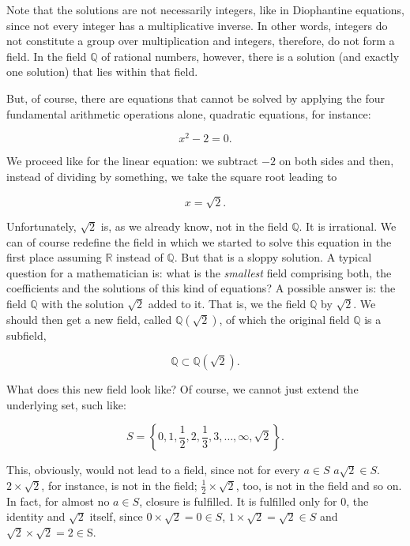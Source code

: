 \documentclass[tikz]{scrreprt}
\begin{document}
Note that the solutions are not necessarily integers,
like in Diophantine equations, since not every integer
has a multiplicative inverse. In other words, integers
do not constitute a group over multiplication and integers,
therefore, do not form a field.
In the field $\mathbb{Q}$ of rational numbers, however,
there is a solution (and exactly one solution) that lies
within that field.

But, of course, there are equations that cannot be solved
by applying the four fundamental arithmetic operations alone,
quadratic equations, for instance:

\begin{equation}
x^2 - 2 = 0.
\end{equation}

We proceed like for the linear equation: we subtract
$-2$ on both sides and then, instead of dividing by something,
we take the square root leading to

\begin{equation}
x = \sqrt{2}.
\end{equation}

Unfortunately, $\sqrt{2}$ is, as we already know,
not in the field $\mathbb{Q}$. It is irrational.
We can of course redefine the field 
in which we started to solve this equation in the first place
assuming $\mathbb{R}$ instead of $\mathbb{Q}$.
But that is a sloppy solution.
A typical question for a mathematician is:
what is the \emph{smallest} field comprising both,
the coefficients and the solutions of this kind of equations?
A possible answer is: the field $\mathbb{Q}$ with the solution
$\sqrt{2}$ added to it. 
That is, we  the field $\mathbb{Q}$
by  $\sqrt{2}$.
We should then get a new field, called $\mathbb{Q}(\sqrt{2})$,
of which the original field $\mathbb{Q}$ is a subfield,
\ie\

\[
\mathbb{Q} \subset \mathbb{Q}\left(\sqrt{2}\right).
\]

What does this new field look like?
Of course, we cannot just extend the underlying set, such like:

\[
S = \left\lbrace 0,1,\frac{1}{2},2,\frac{1}{3},3,
                 \dots,\infty,\sqrt{2}\right\rbrace.
\]

This, obviously, would not lead to a field, since
not for every $a\in S$ $a\sqrt{2} \in S$.
$2\times \sqrt{2}$, for instance, is not in the field;
$\frac{1}{2}\times \sqrt{2}$, too, is not in the field
and so on.
In fact, for almost no $a\in S$, closure is fulfilled.
It is fulfilled only for 0, the identity
and $\sqrt{2}$ itself, since $0\times\sqrt{2} = 0 \in S$,
$1\times \sqrt{2} = \sqrt{2} \in S$ and
$\sqrt{2} \times \sqrt{2} = 2 \in $S.
\end{document}
